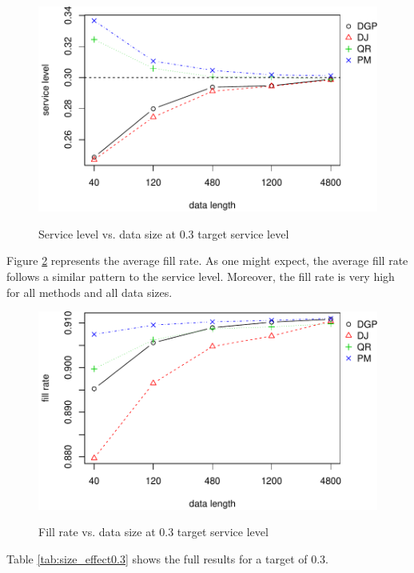 \documentclass{article}
\begin{document}
\begin{figure}[ht]
\centering
\caption{Service level vs. data size at 0.3 target service level}
\includegraphics{linear-norm-plot_files/figure-latex/sl-3.pdf}
\label{fig:sl0.3}
\end{figure}

Figure \ref{fig:fr0.3} represents the average fill rate. As one might expect, the average fill rate follows a similar pattern to the service level. Moreover, the fill rate is very high for all methods and all data sizes. 

\begin{figure}[ht]
\centering
\caption{Fill rate vs. data size at 0.3 target service level}
\includegraphics{linear-norm-plot_files/figure-latex/fr-3.pdf}
\label{fig:fr0.3}
\end{figure}

Table \ref{tab:size_effect0.3} shows the full results for a target of 0.3.
\end{document}
